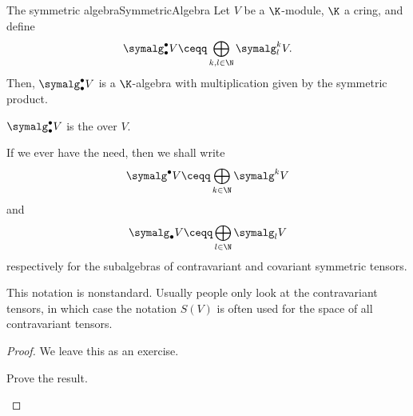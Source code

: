 \begin{thm}{The symmetric algebra}{SymmetricAlgebra}
	Let $V$ be a $\K$-module, $\K$ a cring, and define
	\begin{equation}
		\symalg _{\bullet}^{\bullet}V\ceqq \bigoplus _{k,l\in \N}\symalg _l^kV.
	\end{equation} 
	Then, $\symalg _{\bullet}^{\bullet}V$ is a $\K$-algebra with multiplication given by the symmetric product.
	\begin{rmk}
		$\symalg _{\bullet}^{\bullet}V$ is the  over $V$.
	\end{rmk}
	\begin{rmk}
		If we ever have the need, then we shall write
		\begin{equation}
			\symalg ^{\bullet}V\ceqq \bigoplus _{k\in \N}\symalg ^kV
		\end{equation}\index[notation]{$\symalg ^{\bullet}V$}
		and
		\begin{equation}
			\symalg _{\bullet}V\ceqq \bigoplus _{l\in \N}\symalg _lV
		\end{equation}\index[notation]{$\symalg _{\bullet}V$}
		respectively for the subalgebras of contravariant and covariant symmetric tensors.
	\end{rmk}
	\begin{rmk}
		This notation is nonstandard.  Usually people only look at the contravariant tensors, in which case the notation $S(V)$ is often used for the space of all contravariant tensors.
	\end{rmk}
	\begin{proof}
		We leave this as an exercise.
		\begin{exr}[breakable=false]{}{}
			Prove the result.
		\end{exr}
	\end{proof}
\end{thm}
